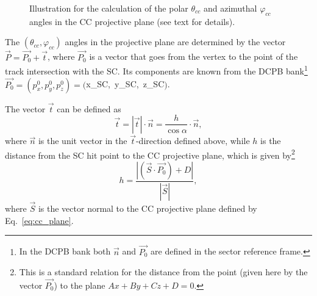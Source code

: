 \begin{figure}[htp]
\begin{center}
\caption{\small  Illustration for the calculation of the polar $\theta_{cc}$ and azimuthal $\varphi_{cc}$ angles in the CC projective plane (see text for details).} \label{fig:cc_plane_def}
\end{center}
\end{figure}


The $(\theta_{cc},\varphi_{cc})$ angles in the projective plane are determined by the vector $\overrightarrow{P}=\overrightarrow{P_{0}}+\overrightarrow{t}$, where $\overrightarrow{P_{0}}$ is a vector that goes from the vertex to the point of the track intersection with the SC. Its components are known from the DCPB bank\footnote[3]{In the DCPB bank both $\overrightarrow{n}$ and $\overrightarrow{P_{0}}$ are defined in the sector reference frame.} $\overrightarrow{P_{0}} = (p_{x}^{0},p_{y}^{0},p_{z}^{0}) = ($x\_SC,~y\_SC,~z\_SC$)$.

The vector $\overrightarrow{t}$ can be defined as
\begin{equation}
 \overrightarrow{t} =  | \overrightarrow{t}  |\cdot \overrightarrow{n}  =  \frac{h}{\cos \alpha}\cdot \overrightarrow{n},
\label{eq:cc_t_vec} 
\end{equation}
where $\overrightarrow{n}$ is the unit vector in the $\overrightarrow{t}$-direction defined above, while $h$ is the distance from the SC hit point to the CC projective plane, which is given by\footnote[4]{This is a standard relation for the distance from the point (given here by the vector $\overrightarrow{P_{0}}$) to the plane $Ax+By+Cz+D = 0$. }
\begin{equation}
h=\frac{|(\overrightarrow{S} \cdot \overrightarrow{P_{0}})+D|}{ |\overrightarrow{S}  |},
\label{eq:cc_h_distance}
\end{equation}
where $\overrightarrow{S}$ is the vector normal to the CC projective plane defined by Eq.~\eqref{eq:cc_plane}.

